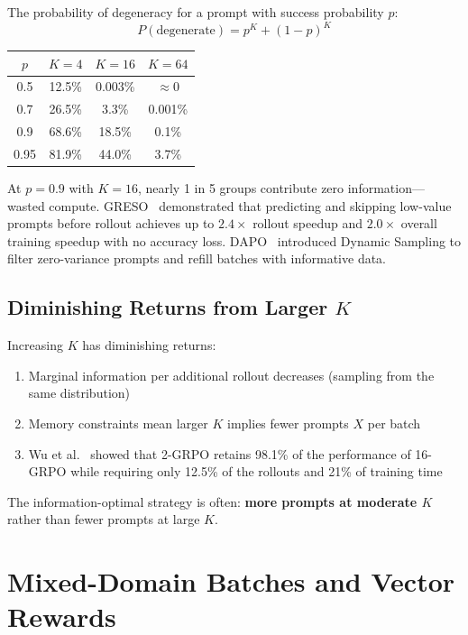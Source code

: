 \documentclass[11pt,a4paper]{article}
\theoremstyle{definition}
\theoremstyle{remark}
\begin{document}
The probability of degeneracy for a prompt with success probability $p$:
\[
P(\text{degenerate}) = p^K + (1-p)^K
\]

\begin{center}
\begin{tabular}{@{}cccc@{}}
\toprule
$p$ & $K=4$ & $K=16$ & $K=64$ \\
\midrule
0.5 & 12.5\% & 0.003\% & $\approx 0$ \\
0.7 & 26.5\% & 3.3\% & 0.001\% \\
0.9 & 68.6\% & 18.5\% & 0.1\% \\
0.95 & 81.9\% & 44.0\% & 3.7\% \\
\bottomrule
\end{tabular}
\end{center}

\begin{takeaway}
At $p = 0.9$ with $K = 16$, nearly 1 in 5 groups contribute zero information---wasted compute. GRESO~\cite{greso2025} demonstrated that predicting and skipping low-value prompts before rollout achieves up to $2.4\times$ rollout speedup and $2.0\times$ overall training speedup with no accuracy loss. DAPO~\cite{dapo2025} introduced Dynamic Sampling to filter zero-variance prompts and refill batches with informative data.
\end{takeaway}

\subsection{Diminishing Returns from Larger $K$}

Increasing $K$ has diminishing returns:
\begin{enumerate}
    \item Marginal information per additional rollout decreases (sampling from the same distribution)
    \item Memory constraints mean larger $K$ implies fewer prompts $X$ per batch
    \item Wu et al.~\cite{ittakestwo2025} showed that 2-GRPO retains 98.1\% of the performance of 16-GRPO while requiring only 12.5\% of the rollouts and 21\% of training time
\end{enumerate}

The information-optimal strategy is often: \textbf{more prompts at moderate $K$} rather than fewer prompts at large $K$.

\section{Mixed-Domain Batches and Vector Rewards}
\end{document}
